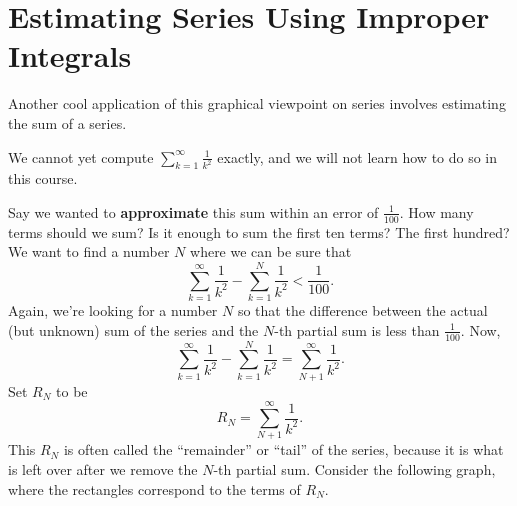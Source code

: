 \documentclass{ximera}
\begin{document}
\section{Estimating Series Using Improper Integrals}

Another cool application of this graphical viewpoint on series
involves estimating the sum of a series.

We cannot yet compute $\sum_{k=1}^\infty \frac{1}{k^2}$ exactly, and
we will not learn how to do so in this course. 

Say we wanted to \textbf{approximate} this sum within an error of
$\frac{1}{100}$.  How many terms should we sum?  Is it enough to sum
the first ten terms?  The first hundred?  We want to find a number $N$
where we can be sure that
\[
\sum_{k=1}^\infty \frac{1}{k^2}-\sum_{k=1}^N \frac{1}{k^2} < \frac{1}{100}.
\]
Again, we're looking for a number $N$ so that the difference between the actual 
(but unknown) sum of the series and the $N$-th partial sum is less than $\frac{1}{100}$. 
Now,
\[
\sum_{k=1}^\infty \frac{1}{k^2}- \sum_{k=1}^N \frac{1}{k^2} = \sum_{N+1}^\infty \frac{1}{k^2}.
\]
Set $R_N$ to be 
\[
R_N = \sum_{N+1}^\infty \frac{1}{k^2}.
\]
This $R_N$ is often called the ``remainder'' or ``tail'' of the series, because it is what is 
left over after we remove the $N$-th partial sum.  Consider the following graph, where the  
rectangles correspond to the terms of $R_N$.
\end{document}
